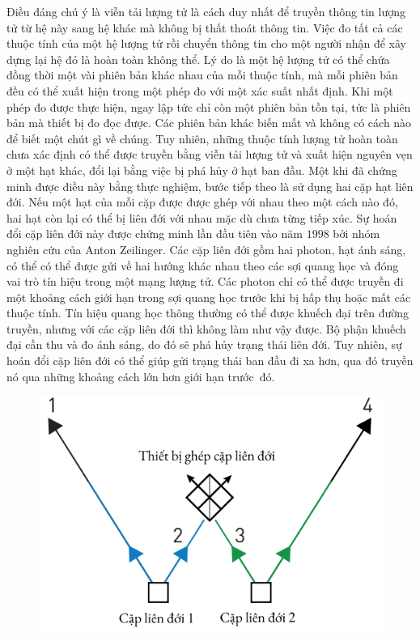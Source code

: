 \begin{multicols}{2}
	\vskip 0.1cm
	Điều đáng chú ý là viễn tải lượng tử là cách duy nhất để truyền thông tin lượng tử từ hệ này sang hệ khác mà không bị thất thoát thông tin. Việc đo tất cả các thuộc tính của một hệ lượng tử rồi chuyển thông tin cho một người nhận để xây dựng lại hệ đó là hoàn toàn không thể. Lý do là một hệ lượng tử có thể chứa đồng thời một vài phiên bản khác nhau của mỗi thuộc tính, mà mỗi phiên bản đều có thể xuất hiện trong một phép đo với một xác suất nhất định. Khi một phép đo được thực hiện, ngay lập tức chỉ còn một phiên bản tồn tại, tức là phiên bản mà thiết bị đo đọc được. Các phiên bản khác biến mất và không có cách nào để biết một chút gì về chúng. Tuy nhiên, những thuộc tính lượng tử hoàn toàn chưa xác định có thể được truyền bằng viễn tải lượng tử và xuất hiện nguyên vẹn ở một hạt khác, đổi lại bằng việc bị phá hủy ở hạt ban đầu.
	\vskip 0.1cm
	Một khi đã chứng minh được điều này bằng thực nghiệm, bước tiếp theo là sử dụng hai cặp hạt liên đới. Nếu một hạt của mỗi cặp được được ghép với nhau theo một cách nào đó, hai hạt còn lại có thể bị liên đới với nhau mặc dù chưa từng tiếp xúc. Sự hoán đổi cặp liên đới này được chứng minh lần đầu tiên vào năm $1998$ bởi nhóm nghiên cứu của Anton Zeilinger.
	\vskip 0.1cm
	Các cặp liên đới gồm hai photon, hạt ánh sáng, có thể có thể được gửi về hai hướng khác nhau theo các sợi quang học và đóng vai trò tín hiệu trong một mạng lượng tử. Các photon chỉ có thể được truyền đi một khoảng cách giới hạn trong sợi quang học trước khi bị hấp thụ hoặc mất các thuộc tính. Tín hiệu quang học thông thường có thể được khuếch đại trên đường truyền, nhưng với các cặp liên đới thì không làm như vậy được. Bộ phận khuếch đại cần thu và đo ánh sáng, do đó sẽ phá hủy trạng thái liên đới. Tuy nhiên, sự hoán đổi cặp liên đới có thể giúp gửi trạng thái ban đầu đi xa hơn, qua đó truyền nó qua những khoảng cách lớn hơn giới hạn trước~đó.
	\begin{figure}[H]
		\vspace*{-5pt}
		\centering
		\captionsetup{labelformat= empty, justification=centering}
		\includegraphics[width= 0.9\linewidth]{3}

\end{figure}
\end{multicols}
